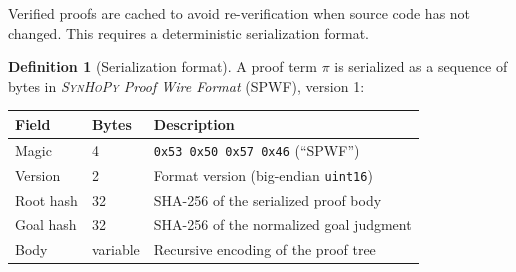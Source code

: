 \documentclass[11pt,a4paper]{report}
\theoremstyle{definition}
\newtheorem{definition}{Definition}[chapter]
\theoremstyle{plain}
\newcommand{\synhopy}{\textsc{SynHoPy}}
\begin{document}
Verified proofs are cached to avoid re-verification when source code
has not changed. This requires a deterministic serialization format.

\begin{definition}[Serialization format]
\label{def:serialization}
A proof term $\pi$ is serialized as a sequence of bytes in
\emph{\synhopy{} Proof Wire Format} (SPWF), version 1:
\begin{center}
\begin{tabular}{llp{7cm}}
  \toprule
  \textbf{Field} & \textbf{Bytes} & \textbf{Description} \\
  \midrule
  Magic & 4 & \texttt{0x53 0x50 0x57 0x46} (``SPWF'') \\
  Version & 2 & Format version (big-endian \texttt{uint16}) \\
  Root hash & 32 & SHA-256 of the serialized proof body \\
  Goal hash & 32 & SHA-256 of the normalized goal judgment \\
  Body & variable & Recursive encoding of the proof tree \\
  \bottomrule
\end{tabular}
\end{center}
\end{definition}
\end{document}
